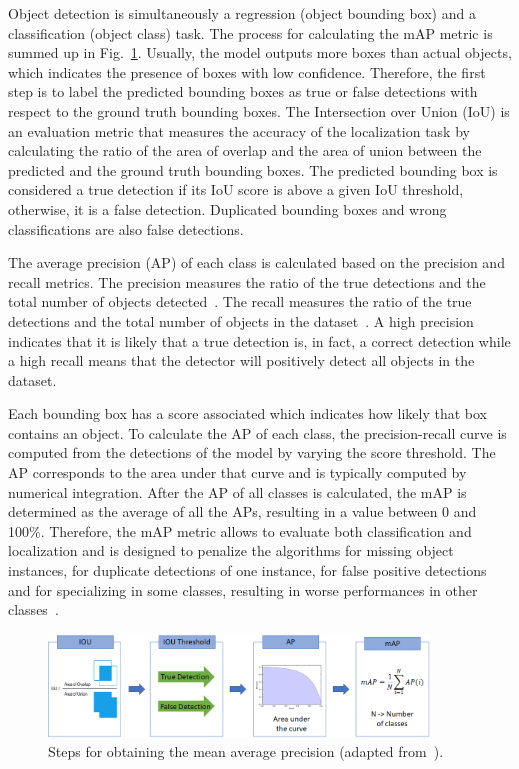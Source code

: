 Object detection is simultaneously a regression (object bounding box) and a
classification (object class) task. The process for calculating the mAP metric
is summed up in Fig.~\ref{fig:map}. Usually, the model outputs more boxes than
actual objects, which indicates the presence of boxes with low
confidence. Therefore, the first step is to label the predicted bounding boxes
as true or false detections with respect to the ground truth bounding boxes. The
Intersection over Union (IoU) is an evaluation metric that measures the accuracy
of the localization task by calculating the ratio of the area of overlap and the
area of union between the predicted and the ground truth bounding boxes. The
predicted bounding box is considered a true detection if its IoU score is above
a given IoU threshold, otherwise, it is a false detection. Duplicated bounding
boxes and wrong classifications are also false detections.

The average precision (AP) of each class is calculated based on the precision and recall metrics. The precision measures the ratio of the true detections and the total number of objects detected~\cite{unlu:real_app}. The recall measures the ratio of the true detections and the total number of objects in the dataset~\cite{unlu:real_app}. A high precision indicates that it is likely that a true detection is, in fact, a correct detection while a high recall means that the detector will positively detect all objects in the dataset.

Each bounding box has a score associated which indicates how likely that box contains an object. To calculate the AP of each class, the precision-recall curve is computed from the detections of the model by varying the score threshold. The AP corresponds to the area under that curve and is typically computed by numerical integration. After the AP of all classes is calculated, the mAP is determined as the average of all the APs, resulting in a value between 0 and 100\%. Therefore, the mAP metric allows to evaluate both classification and localization and is designed to penalize the algorithms for missing object instances, for duplicate detections of one instance, for false positive detections and for specializing in some classes, resulting in worse performances in other classes~\cite{jiao:obj_survey}.

\begin{figure}[!htb]
  \centering
  \includegraphics[width=0.9\textwidth]{Figures/mAP.png}
  \caption{Steps for obtaining the mean average precision (adapted from~\cite{unlu:real_app}).}
  \label{fig:map}
\end{figure}

